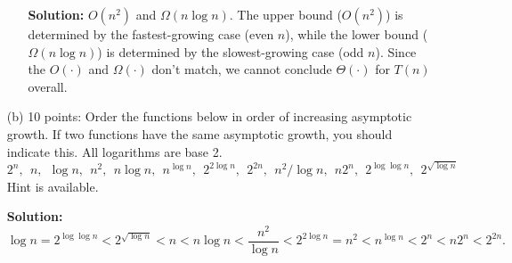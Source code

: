 \documentclass[12pt]{article}
\begin{document}
\begin{enumerate}
\begin{enumerate}
\textbf{Solution:} $O(n^2)$ and $\Omega(n\log n)$. The upper bound ($O(n^2)$) is determined by the fastest-growing case (even $n$), while the lower bound ($\Omega(n\log n)$) is determined by the slowest-growing case (odd $n$). Since the $O(\cdot)$ and $\Omega(\cdot)$ don't match, we cannot conclude $\Theta(\cdot)$ for $T(n)$ overall.
\end{enumerate}

\item[(b)] 10 points: Order the functions below in order of increasing asymptotic growth. If two functions have the same asymptotic growth, you should indicate this. All logarithms are base 2.\\
$2^n, ~~ n, ~~ \log n, ~~ n^2, ~~ n\log n, ~~ n^{\log n}, ~~ 2^{2\log n}, ~~ 2^{2n}, ~~ n^2/{\log n}, ~~ n2^n, ~~ 2^{\log\log n}, ~~ 2^{\sqrt{\log n}}$\\
Hint is available.

\textbf{Solution:}
\[
\log n = 2^{\log\log n} < 2^{\sqrt{\log n}} < n < n\log n < \frac{n^2}{\log n} < 2^{2\log n}=n^2 < n^{\log n} < 2^n < n2^n < 2^{2n}.
\]
\end{enumerate}
\end{document}
